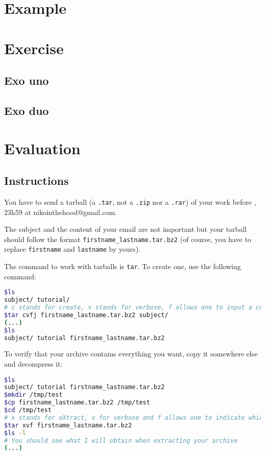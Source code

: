 \documentclass[12pt]{article}
\begin{document}
\section{Example}

\section{Exercise}
\subsection{Exo uno}
\subsection{Exo duo}

\section{Evaluation}

\subsection{Instructions}

You have to send a tarball (a \texttt{.tar}, not a \texttt{.zip} nor a \texttt{.rar}) of your work before , 23h59 at nikointhehood@gmail.com.

The subject and the content of your email are not important but your tarball should follow the format \texttt{firstname\_lastname.tar.bz2} (of course, you have to replace \texttt{firstname} and \texttt{lastname} by yours).

The command to work with tarballs is \texttt{tar}. To create one, use the following command:

\begin{lstlisting}[language=bash]
$ls
subject/ tutorial/
# c stands for create, v stands for verbose, f allows one to input a custom name for the archive and j indicates the usage of bzip2
$tar cvfj firstname_lastname.tar.bz2 subject/
(...)
$ls
subject/ tutorial firstname_lastname.tar.bz2
\end{lstlisting}

To verify that your archive contains everything you want, copy it somewhere else and decompress it:

\begin{lstlisting}[language=bash]
$ls
subject/ tutorial firstname_lastname.tar.bz2
$mkdir /tmp/test
$cp firstname_lastname.tar.bz2 /tmp/test
$cd /tmp/test
# x stands for eXtract, v for verbose and f allows one to indicate which file tar should work with
$tar xvf firstname_lastname.tar.bz2
$ls -l
# You should see what I will obtain when extracting your archive
(...)
\end{lstlisting}
\end{document}
